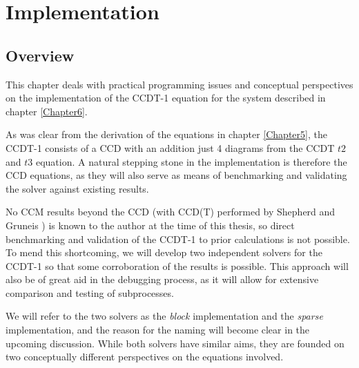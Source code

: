 
\chapter{Implementation} %

\label{Chapter7} %



\section{Overview}

This chapter deals with practical programming issues and conceptual perspectives on the implementation of the CCDT-1 equation for the system described in chapter \ref{Chapter6}.

As was clear from the derivation of the equations in chapter \ref{Chapter5}, the CCDT-1 consists of a CCD with an addition just 4 diagrams from the CCDT $t2$ and $t3$ equation. A natural stepping stone in the implementation is therefore the CCD equations, as they will also serve as means of benchmarking and validating the solver against existing results. 

No CCM results beyond the CCD (with CCD(T) performed by Shepherd and Gruneis \cite{Shepherd2013c}) is known to the author at the time of this thesis, so direct benchmarking and validation of the CCDT-1 to prior calculations is not possible. To mend this shortcoming, we will develop two independent solvers for the CCDT-1 so that some corroboration of the results is possible. This approach will also be of great aid in the debugging process, as it will allow for extensive comparison and testing of subprocesses.

We will refer to the two solvers as the \emph{block} implementation and the \emph{sparse} implementation, and the reason for the naming will become clear in the upcoming discussion. While both solvers have similar aims, they are founded on two conceptually different perspectives on the equations involved. 

